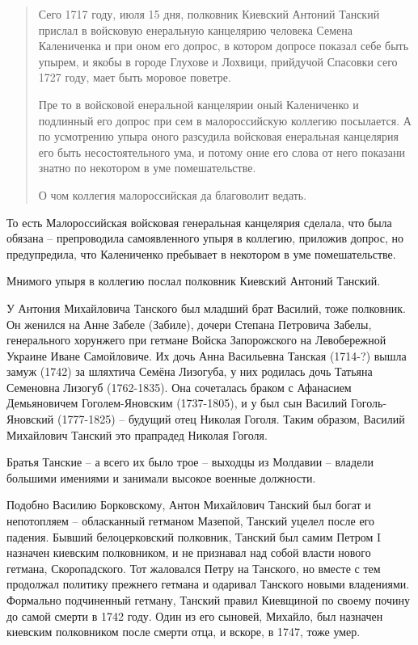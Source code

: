 \documentclass[a5paper,11pt,openany]{article}
\begin{document}
\begin{quotation}
\noindent Сего 1717 году, июля 15 дня, полковник Киевский Антоний Танский прислал в войсковую енеральную канцелярию человека Семена Калениченка и при оном его допрос, в котором допросе показал себе быть упырем, и якобы в городе Глухове и Лохвици, прийдучой Спасовки сего 1727 году, мает быть моровое поветре.

Пре то в войсковой енеральной канцелярии оный Калениченко и подлинный его допрос при сем в малороссийскую коллегию посылается.
А по усмотрению упыра оного разсудила войсковая енеральная канцелярия его быть несостоятельного ума, и потому оние его слова от него показани знатно по некотором в уме помешательстве.

О чом коллегия малороссийская да благоволит ведать.
\end{quotation}

   То есть Малороссийская войсковая генеральная канцелярия сделала, что была обязана – препроводила самоявленного упыря в коллегию, приложив допрос, но предупредила, что Калениченко пребывает в некотором в уме помешательстве. 

   Мнимого упыря в коллегию послал полковник Киевский Антоний Танский.

   У Антония Михайловича Танского был младший брат Василий, тоже полковник. Он женился на Анне Забеле (Забиле), дочери Степана Петровича Забелы, генерального хорунжего при гетмане Войска Запорожского на Левобережной Украине Иване Самойловиче. Их дочь Анна Васильевна Танская (1714-?) вышла замуж (1742) за шляхтича Семёна Лизогуба, у них родилась дочь Татьяна Семеновна Лизогуб (1762-1835). Она сочеталась браком с Афанасием Демьяновичем Гоголем-Яновским (1737-1805), и у был сын Василий Гоголь-Яновский (1777-1825) – будущий отец Николая Гоголя. Таким образом, Василий Михайлович Танский это прапрадед Николая Гоголя.

   Братья Танские – а всего их было трое – выходцы из Молдавии – владели большими имениями и занимали высокое военные должности.

   Подобно Василию Борковскому, Антон Михайлович Танский был богат и непотопляем – обласканный гетманом Мазепой, Танский уцелел после его падения. Бывший белоцерковский полковник, Танский был самим Петром I назначен киевским полковником, и не признавал над собой власти нового гетмана, Скоропадского. Тот жаловался Петру на Танского, но вместе с тем продолжал политику прежнего гетмана и одаривал Танского новыми владениями. Формально подчиненный гетману, Танский правил Киевщиной по своему почину до самой смерти в 1742 году. Один из его сыновей, Михайло, был назначен киевским полковником после смерти отца, и вскоре, в 1747, тоже умер.
\end{document}
